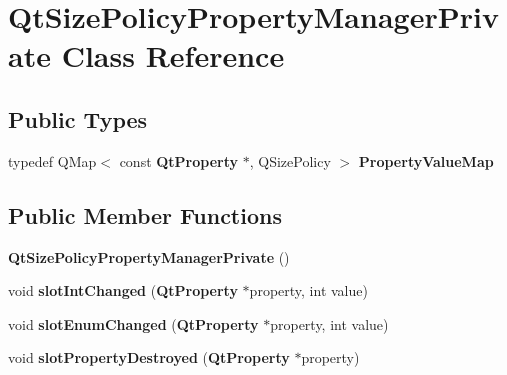 \section{Qt\+Size\+Policy\+Property\+Manager\+Private Class Reference}
\label{classQtSizePolicyPropertyManagerPrivate}
\subsection*{Public Types}
\begin{DoxyCompactItemize}
\item 
typedef Q\+Map$<$ const {\bf Qt\+Property} $\ast$, Q\+Size\+Policy $>$ {\bf Property\+Value\+Map}
\end{DoxyCompactItemize}
\subsection*{Public Member Functions}
\begin{DoxyCompactItemize}
\item 
{\bf Qt\+Size\+Policy\+Property\+Manager\+Private} ()
\item 
void {\bf slot\+Int\+Changed} ({\bf Qt\+Property} $\ast$property, int value)
\item 
void {\bf slot\+Enum\+Changed} ({\bf Qt\+Property} $\ast$property, int value)
\item 
void {\bf slot\+Property\+Destroyed} ({\bf Qt\+Property} $\ast$property)
\end{DoxyCompactItemize}
